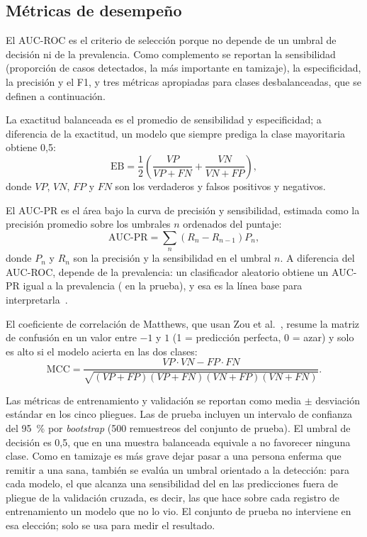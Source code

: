 \documentclass[journal]{IEEEtran}
\begin{document}
\subsection{Métricas de desempeño}\label{sec:metricas}
El AUC-ROC es el criterio de selección porque no depende de un umbral de decisión ni de la prevalencia. Como complemento se reportan la sensibilidad (proporción de casos detectados, la más importante en tamizaje), la especificidad, la precisión y el F1, y tres métricas apropiadas para clases desbalanceadas, que se definen a continuación.

La exactitud balanceada es el promedio de sensibilidad y especificidad; a diferencia de la exactitud, un modelo que siempre prediga la clase mayoritaria obtiene 0,5:
\begin{equation}
\mathrm{EB}=\frac{1}{2}\left(\frac{VP}{VP+FN}+\frac{VN}{VN+FP}\right),
\end{equation}
donde $VP$, $VN$, $FP$ y $FN$ son los verdaderos y falsos positivos y negativos.

El AUC-PR es el área bajo la curva de precisión y sensibilidad, estimada como la precisión promedio sobre los umbrales $n$ ordenados del puntaje:
\begin{equation}
\mathrm{AUC\text{-}PR}=\sum_{n}\left(R_n-R_{n-1}\right)P_n,
\end{equation}
donde $P_n$ y $R_n$ son la precisión y la sensibilidad en el umbral $n$. A diferencia del AUC-ROC, depende de la prevalencia: un clasificador aleatorio obtiene un AUC-PR igual a la prevalencia (\lineaBasePR{} en la prueba), y esa es la línea base para interpretarla~\cite{saito2015}.

El coeficiente de correlación de Matthews, que usan Zou et al.~\cite{zou2018}, resume la matriz de confusión en un valor entre $-1$ y $1$ (1 = predicción perfecta, 0 = azar) y solo es alto si el modelo acierta en las dos clases:
\begin{equation}
\mathrm{MCC}=\frac{VP\cdot VN-FP\cdot FN}{\sqrt{(VP+FP)(VP+FN)(VN+FP)(VN+FN)}}.
\end{equation}

Las métricas de entrenamiento y validación se reportan como media $\pm$ desviación estándar en los cinco pliegues. Las de prueba incluyen un intervalo de confianza del 95~\% por \emph{bootstrap} (500 remuestreos del conjunto de prueba). El umbral de decisión es 0,5, que en una muestra balanceada equivale a no favorecer ninguna clase. Como en tamizaje es más grave dejar pasar a una persona enferma que remitir a una sana, también se evalúa un umbral orientado a la detección: para cada modelo, el que alcanza una sensibilidad del \sensObjetivo{} en las predicciones fuera de pliegue de la validación cruzada, es decir, las que hace sobre cada registro de entrenamiento un modelo que no lo vio. El conjunto de prueba no interviene en esa elección; solo se usa para medir el resultado.
\end{document}

